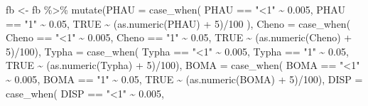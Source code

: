 \documentclass[
]{book}
\newenvironment{Shaded}{\begin{snugshade}}{\end{snugshade}}
\newcommand{\AttributeTok}[1]{\textcolor[rgb]{0.77,0.63,0.00}{#1}}
\newcommand{\ConstantTok}[1]{\textcolor[rgb]{0.00,0.00,0.00}{#1}}
\newcommand{\DecValTok}[1]{\textcolor[rgb]{0.00,0.00,0.81}{#1}}
\newcommand{\FloatTok}[1]{\textcolor[rgb]{0.00,0.00,0.81}{#1}}
\newcommand{\FunctionTok}[1]{\textcolor[rgb]{0.00,0.00,0.00}{#1}}
\newcommand{\NormalTok}[1]{#1}
\newcommand{\OtherTok}[1]{\textcolor[rgb]{0.56,0.35,0.01}{#1}}
\newcommand{\SpecialCharTok}[1]{\textcolor[rgb]{0.00,0.00,0.00}{#1}}
\newcommand{\StringTok}[1]{\textcolor[rgb]{0.31,0.60,0.02}{#1}}
\begin{document}
\begin{Shaded}
\begin{Highlighting}[]
\NormalTok{fb }\OtherTok{\textless{}{-}}\NormalTok{ fb }\SpecialCharTok{\%\textgreater{}\%} 
  \FunctionTok{mutate}\NormalTok{(}\AttributeTok{PHAU =} \FunctionTok{case\_when}\NormalTok{(}
\NormalTok{          PHAU }\SpecialCharTok{==} \StringTok{"\textless{}1"} \SpecialCharTok{\textasciitilde{}} \FloatTok{0.005}\NormalTok{, }
\NormalTok{          PHAU }\SpecialCharTok{==} \StringTok{"1"} \SpecialCharTok{\textasciitilde{}} \FloatTok{0.05}\NormalTok{, }
          \ConstantTok{TRUE} \SpecialCharTok{\textasciitilde{}}\NormalTok{ (}\FunctionTok{as.numeric}\NormalTok{(PHAU) }\SpecialCharTok{+} \DecValTok{5}\NormalTok{)}\SpecialCharTok{/}\DecValTok{100}\NormalTok{ ),}
         \AttributeTok{Cheno =} \FunctionTok{case\_when}\NormalTok{(}
\NormalTok{          Cheno }\SpecialCharTok{==} \StringTok{"\textless{}1"} \SpecialCharTok{\textasciitilde{}} \FloatTok{0.005}\NormalTok{, }
\NormalTok{          Cheno }\SpecialCharTok{==} \StringTok{"1"} \SpecialCharTok{\textasciitilde{}} \FloatTok{0.05}\NormalTok{, }
          \ConstantTok{TRUE} \SpecialCharTok{\textasciitilde{}}\NormalTok{ (}\FunctionTok{as.numeric}\NormalTok{(Cheno) }\SpecialCharTok{+} \DecValTok{5}\NormalTok{)}\SpecialCharTok{/}\DecValTok{100}\NormalTok{),}
        \AttributeTok{Typha =} \FunctionTok{case\_when}\NormalTok{(}
\NormalTok{          Typha }\SpecialCharTok{==} \StringTok{"\textless{}1"} \SpecialCharTok{\textasciitilde{}} \FloatTok{0.005}\NormalTok{, }
\NormalTok{          Typha }\SpecialCharTok{==} \StringTok{"1"} \SpecialCharTok{\textasciitilde{}} \FloatTok{0.05}\NormalTok{, }
          \ConstantTok{TRUE} \SpecialCharTok{\textasciitilde{}}\NormalTok{ (}\FunctionTok{as.numeric}\NormalTok{(Typha) }\SpecialCharTok{+} \DecValTok{5}\NormalTok{)}\SpecialCharTok{/}\DecValTok{100}\NormalTok{),}
        \AttributeTok{BOMA =} \FunctionTok{case\_when}\NormalTok{(}
\NormalTok{          BOMA }\SpecialCharTok{==} \StringTok{"\textless{}1"} \SpecialCharTok{\textasciitilde{}} \FloatTok{0.005}\NormalTok{, }
\NormalTok{          BOMA }\SpecialCharTok{==} \StringTok{"1"} \SpecialCharTok{\textasciitilde{}} \FloatTok{0.05}\NormalTok{, }
          \ConstantTok{TRUE} \SpecialCharTok{\textasciitilde{}}\NormalTok{ (}\FunctionTok{as.numeric}\NormalTok{(BOMA) }\SpecialCharTok{+} \DecValTok{5}\NormalTok{)}\SpecialCharTok{/}\DecValTok{100}\NormalTok{),}
        \AttributeTok{DISP =} \FunctionTok{case\_when}\NormalTok{(}
\NormalTok{          DISP }\SpecialCharTok{==} \StringTok{"\textless{}1"} \SpecialCharTok{\textasciitilde{}} \FloatTok{0.005}\NormalTok{, }

\end{Highlighting}
\end{Shaded}
\end{document}
